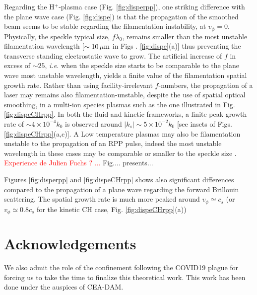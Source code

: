 \documentclass[
 reprint,
 amsmath,amssymb,
 aps,
]{revtex4-1}
\begin{document}
Regarding the H$^+$-plasma case (Fig. \ref{fig:disperpp}), one striking difference with the plane wave case  (Fig. \ref{fig:dispe}) is that the propagation of the smoothed beam seems to be stable regarding the filamentation instability, at $v_\phi=0$.
Physically, the speckle typical size, $f\lambda_0$, remains smaller than the most unstable filamentation wavelength [$\sim 10 \,\rm\mu m$ in Figs . \ref{fig:dispe}(a)] thus preventing the transverse standing electrostatic wave to grow. The artificial increase of $f$ in excess of $\sim 25$, \emph{i.e.} when the speckle size starts to be comparable to the plane wave most unstable wavelength,  yields a finite value of the filamentation spatial growth rate. Rather than using facility-irrelevant $f$-numbers, the propagation of a laser may remains also filamentation-unstable, despite the use of spatial optical smoothing,  in  a multi-ion species plasmas such as the one illustrated in Fig. \ref{fig:dispeCHrpp}. In both the fluid and kinetic frameworks, a finite peak growth rate of $\sim 4\times 10^{-4}k_0 $ is observed around $\vert k_s\vert \sim 5\times 10^{-2}k_0$ [see insets of Figs. \ref{fig:dispeCHrpp}(a,c)]. A
Low temperature plasmas may also be filamentation unstable to the  propagation of an RPP pulse, indeed the most unstable wavelength in these cases may be comparable or smaller to the speckle size \cite[]{}. \textcolor{red}{Experience de Julien Fuchs ? ...} 
Fig....  presents...

Figures \ref{fig:disperpp} and \ref{fig:dispeCHrpp} shows also significant differences compared to the propagation of a plane wave  regarding the forward Brillouin scattering.  
The spatial growth rate is much more peaked around $v_\phi\simeq c_s$ (or $v_\phi\simeq 0.8c_s$ for  the kinetic CH case, Fig. \ref{fig:dispeCHrpp}(a))





\section*{Acknowledgements}
We also admit the role of the confinement following the COVID19 plague for forcing us to take the time to finalize this theoretical work. This work has been done under the auspices of CEA-DAM. 

\end{document}
